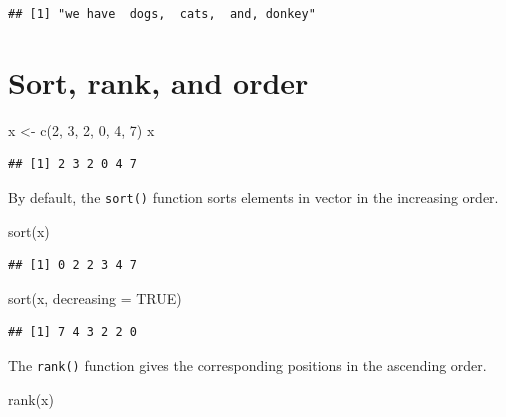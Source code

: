 \documentclass[
]{book}
\newenvironment{Shaded}{\begin{snugshade}}{\end{snugshade}}
\newcommand{\AttributeTok}[1]{\textcolor[rgb]{0.77,0.63,0.00}{#1}}
\newcommand{\ConstantTok}[1]{\textcolor[rgb]{0.00,0.00,0.00}{#1}}
\newcommand{\DecValTok}[1]{\textcolor[rgb]{0.00,0.00,0.81}{#1}}
\newcommand{\FunctionTok}[1]{\textcolor[rgb]{0.00,0.00,0.00}{#1}}
\newcommand{\NormalTok}[1]{#1}
\newcommand{\OtherTok}[1]{\textcolor[rgb]{0.56,0.35,0.01}{#1}}
\theoremstyle{definition}
\theoremstyle{definition}
\theoremstyle{definition}
\theoremstyle{definition}
\theoremstyle{remark}
\begin{document}
\begin{verbatim}
## [1] "we have  dogs,  cats,  and, donkey"
\end{verbatim}

\hypertarget{sort-rank-and-order}{%
\section{Sort, rank, and order}\label{sort-rank-and-order}}

\begin{Shaded}
\begin{Highlighting}[]
\NormalTok{x }\OtherTok{\textless{}{-}} \FunctionTok{c}\NormalTok{(}\DecValTok{2}\NormalTok{, }\DecValTok{3}\NormalTok{, }\DecValTok{2}\NormalTok{, }\DecValTok{0}\NormalTok{, }\DecValTok{4}\NormalTok{, }\DecValTok{7}\NormalTok{) }
\NormalTok{x }
\end{Highlighting}
\end{Shaded}

\begin{verbatim}
## [1] 2 3 2 0 4 7
\end{verbatim}

By default, the \texttt{sort()} function sorts elements in vector in the increasing order.

\begin{Shaded}
\begin{Highlighting}[]
\FunctionTok{sort}\NormalTok{(x)}
\end{Highlighting}
\end{Shaded}

\begin{verbatim}
## [1] 0 2 2 3 4 7
\end{verbatim}

\begin{Shaded}
\begin{Highlighting}[]
\FunctionTok{sort}\NormalTok{(x, }\AttributeTok{decreasing =} \ConstantTok{TRUE}\NormalTok{)}
\end{Highlighting}
\end{Shaded}

\begin{verbatim}
## [1] 7 4 3 2 2 0
\end{verbatim}

The \texttt{rank()} function gives the corresponding positions in the ascending order.

\begin{Shaded}
\begin{Highlighting}[]
\FunctionTok{rank}\NormalTok{(x)}
\end{Highlighting}
\end{Shaded}
\end{document}
